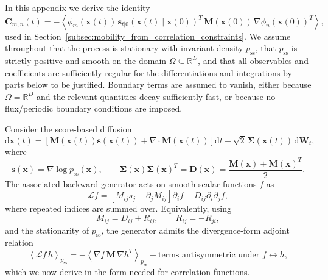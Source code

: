 \documentclass[11pt,twoside,fleqn]{article}
\renewcommand{\d}{\mathrm{d}}
\begin{document}
In this appendix we derive the identity
\begin{equation}
    \dot{\bm{C}}_{m,n}(t)
    =
    -
    \left\langle
        \phi_m(\bm{x}(t))\,
        \bm{s}_{t|0}(\bm{x}(t)\mid \bm{x}(0))^T\,
        \bm{M}(\bm{x}(0))\,
        \nabla\phi_n(\bm{x}(0))^T
    \right\rangle ,
    \label{eq:app_central_conditional_score_identity}
\end{equation}
used in Section~\ref{subsec:mobility_from_correlation_constraints}. We assume throughout that the process is stationary with invariant density $p_{\mathrm{ss}}$, that $p_{\mathrm{ss}}$ is strictly positive and smooth on the domain $\Omega\subseteq\mathbb{R}^D$, and that all observables and coefficients are sufficiently regular for the differentiations and integrations by parts below to be justified. Boundary terms are assumed to vanish, either because $\Omega=\mathbb{R}^D$ and the relevant quantities decay sufficiently fast, or because no-flux/periodic boundary conditions are imposed.

Consider the score-based diffusion
\begin{equation}
    \d \bm{x}(t)
    =
    \left[
        \bm{M}(\bm{x}(t))\bm{s}(\bm{x}(t))
        +
        \nabla\cdot\bm{M}(\bm{x}(t))
    \right]\d t
    +
    \sqrt{2}\,\bm{\Sigma}(\bm{x}(t))\,\d \bm{W}_t,
    \label{eq:app_score_based_sde_for_identity}
\end{equation}
where
\begin{equation}
    \bm{s}(\bm{x})
    =
    \nabla\log p_{\mathrm{ss}}(\bm{x}),
    \qquad
    \bm{\Sigma}(\bm{x})\bm{\Sigma}(\bm{x})^T
    =
    \bm{D}(\bm{x})
    =
    \frac{\bm{M}(\bm{x})+\bm{M}(\bm{x})^T}{2}.
    \label{eq:app_score_sde_definitions}
\end{equation}
The associated backward generator acts on smooth scalar functions $f$ as
\begin{equation}
    \mathcal{L}f
    =
    \left[
        M_{ij}s_j
        +
        \partial_j M_{ij}
    \right]\partial_i f
    +
    D_{ij}\partial_i\partial_j f ,
    \label{eq:app_backward_generator_score_form}
\end{equation}
where repeated indices are summed over. Equivalently, using
\begin{equation}
    M_{ij}
    =
    D_{ij}+R_{ij},
    \qquad
    R_{ij}=-R_{ji},
    \label{eq:app_M_D_R_decomposition_identity}
\end{equation}
and the stationarity of $p_{\mathrm{ss}}$, the generator admits the divergence-form adjoint relation
\begin{equation}
    \left\langle
        \mathcal{L}f\,h
    \right\rangle_{p_{\mathrm{ss}}}
    =
    -
    \left\langle
        \nabla f\,
        \bm{M}\,
        \nabla h^T
    \right\rangle_{p_{\mathrm{ss}}}
    +
    \text{terms antisymmetric under }f\leftrightarrow h,
    \label{eq:app_generator_weak_form_intro}
\end{equation}
which we now derive in the form needed for correlation functions.
\end{document}

